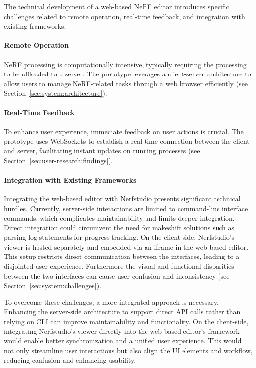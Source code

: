 The technical development of a web-based NeRF editor introduces specific challenges related to remote operation, real-time feedback, and integration with existing frameworks:

\paragraph{Remote Operation} NeRF processing is computationally intensive, typically requiring the processing to be offloaded to a server.
The prototype leverages a client-server architecture to allow users to manage NeRF-related tasks through a web browser efficiently (see Section~\ref{sec:system:architecture}).
    
\paragraph{Real-Time Feedback} To enhance user experience, immediate feedback on user actions is crucial.
The prototype uses WebSockets to establish a real-time connection between the client and server, facilitating instant updates on running processes (see Section~\ref{sec:user-research:findings}).
    
\paragraph{Integration with Existing Frameworks} Integrating the web-based editor with Nerfstudio presents significant technical hurdles.
Currently, server-side interactions are limited to command-line interface commands, which complicates maintainability and limits deeper integration.
Direct integration could circumvent the need for makeshift solutions such as parsing log statements for progress tracking.
On the client-side, Nerfstudio's viewer is hosted separately and embedded via an iframe in the web-based editor.
This setup restricts direct communication between the interfaces, leading to a disjointed user experience.
Furthermore the visual and functional disparities between the two interfaces can cause user confusion and inconsistency (see Section~\ref{sec:system:challenges}).

To overcome these challenges, a more integrated approach is necessary.
Enhancing the server-side architecture to support direct API calls rather than relying on CLI can improve maintainability and functionality.
On the client-side, integrating Nerfstudio's viewer directly into the web-based editor's framework would enable better synchronization and a unified user experience.
This would not only streamline user interactions but also align the UI elements and workflow, reducing confusion and enhancing usability.


